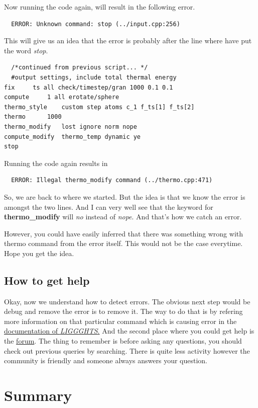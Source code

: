 \documentclass{tufte-book} %
\newcommand{\Li}{\textit{LIGGGHTS}}
\begin{document}
Now running the code again, will result in the following error.

\begin{verbatim}
  ERROR: Unknown command: stop (../input.cpp:256)

\end{verbatim}
This will give us an idea that the error is probably after the line where have put the word \textit{stop}.
\begin{verbatim}
  /*continued from previous script... */
  #output settings, include total thermal energy
fix		ts all check/timestep/gran 1000 0.1 0.1
compute		1 all erotate/sphere
thermo_style	custom step atoms c_1 f_ts[1] f_ts[2]  
thermo		1000
thermo_modify	lost ignore norm nope
compute_modify	thermo_temp dynamic ye
stop
  \end{verbatim}

Running the code again results in
\begin{verbatim}
  ERROR: Illegal thermo_modify command (../thermo.cpp:471)
\end{verbatim}

So, we are back to where we started. But the idea is that we know the error is amongst the two lines. And I can very well see that the keyword for \textbf{thermo\_modify} will \emph{no} instead of \textit{nope}. And that's how we catch an error.

However, you could have easily inferred that there was something wrong with thermo command from the error itself. This would not be the case everytime. Hope you get the idea.

\subsection{How to get help}

Okay, now we understand how to detect errors. The obvious next step would be debug and remove the error is to remove it. The way to do that is by refering more information on that particular command which is causing error in the \href{http://www.cfdem.com/media/DEM/docu/Section_commands.html#comm}{documentation of \Li.}
And the second place where you could get help is the \href{http://www.cfdem.com/forum}{forum}. The thing to remember is before asking any questions, you should check out previous queries by searching. There is quite less activity however the community is friendly and someone always answers your question.

\section{Summary}
\end{document}
